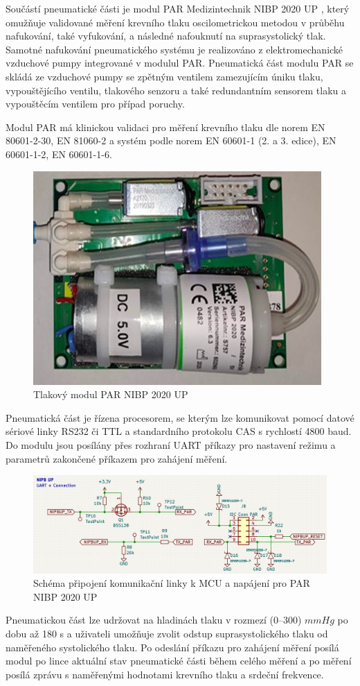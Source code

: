 Součástí pneumatické části je modul PAR Medizintechnik NIBP 2020 UP , který omužňuje validované měření krevního tlaku oscilometrickou metodou v průběhu nafukování, také vyfukování, a následné nafouknutí na suprasystolický tlak. Samotné nafukování pneumatického systému je realizováno z elektromechanické vzduchové pumpy integrované v modulul PAR.
Pneumatická část modulu PAR se skládá ze vzduchové pumpy se zpětným ventilem zamezujícím úniku tlaku, vypouštějícího ventilu, tlakového senzoru a také redundantním sensorem tlaku a vypouštěcím ventilem pro případ poruchy. \par
Modul PAR má klinickou validaci pro měření krevního tlaku dle norem EN 80601-2-30, EN 81060-2 a systém podle norem EN 60601-1 (2. a 3. edice), EN 60601-1-2, EN 60601-1-6.
\begin{figure}[H]
    \centering
    \includegraphics{pictures/par_nibp_up.jpg}
    \caption{Tlakový modul PAR NIBP 2020 UP}
    \label{fig:par_modul}
\end{figure}

Pneumatická část je řízena procesorem, se kterým lze komunikovat pomocí datové sériové linky RS232 či TTL a standardního protokolu CAS s rychlostí 4800 baud. Do modulu jsou posílány přes rozhraní UART příkazy pro nastavení režimu a parametrů zakončené příkazem pro zahájení měření.
\begin{figure}[H]
    \centering
    \includegraphics[width=0.9\linewidth]{pictures/nibpup_connection.jpg}
    \caption{Schéma připojení komunikační linky k MCU a napájení pro PAR NIBP 2020 UP }
    \label{fig:par_modul_comm}
\end{figure}
Pneumatickou část lze udržovat na hladinách tlaku v rozmezí (0–300) $mmHg$ po dobu až 180 s a uživateli umožňuje zvolit odstup suprasystolického tlaku od naměřeného systolického tlaku. Po odeslání příkazu pro zahájení měření posílá modul po lince aktuální stav pneumatické části během celého měření a po měření posílá zprávu s naměřenými hodnotami krevního tlaku a srdeční frekvence.
